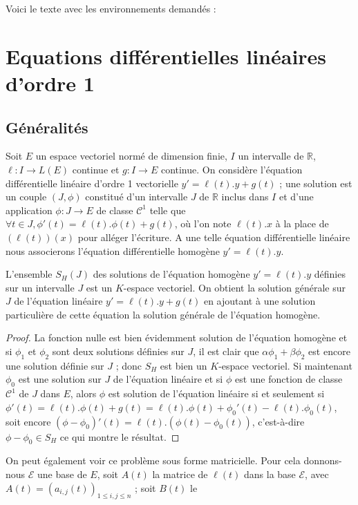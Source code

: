 Voici le texte avec les environnements demandés :
\section{Equations différentielles linéaires d'ordre 1}
\subsection{Généralités}
Soit $E$ un espace vectoriel normé de dimension finie, $I$ un intervalle de
$\mathbb{R}$, $\ell : I \rightarrow L(E)$ continue et $g : I \rightarrow E$ continue. On considère l'équation
différentielle linéaire d'ordre 1 vectorielle $y' = \ell(t).y + g(t)$ ; une
solution est un couple $(J,\phi)$ constitué d'un intervalle $J$ de $\mathbb{R}$ inclus
dans $I$ et d'une application $\phi : J \rightarrow E$ de classe $\mathcal{C}^1$ telle que
$\forall t \in J, \phi'(t) = \ell(t).\phi(t) + g(t)$, où l'on note
$\ell(t).x$ à la place de $(\ell(t))(x)$ pour alléger l'écriture. A une telle équation différentielle
linéaire nous associerons l'équation différentielle homogène $y' = \ell(t).y$.
\begin{thm}
L'ensemble $S_H(J)$ des solutions de l'équation
homogène $y' = \ell(t).y$ définies sur un intervalle $J$ est un $K$-espace
vectoriel. On obtient la solution générale sur $J$ de l'équation linéaire
$y' = \ell(t).y + g(t)$ en ajoutant à une solution particulière de cette
équation la solution générale de l'équation homogène.
\end{thm}
\begin{proof}
La fonction nulle est bien évidemment solution de
l'équation homogène et si $\phi_1$ et $\phi_2$ sont deux
solutions définies sur $J$, il est clair que $\alpha \phi_1 + \beta \phi_2$
est encore une solution définie sur $J$ ; donc $S_H$ est bien un $K$-espace vectoriel. Si maintenant $\phi_0$ est une solution sur $J$ de
l'équation linéaire et si $\phi$ est une fonction de classe $\mathcal{C}^1$ de
$J$ dans $E$, alors $\phi$ est solution de l'équation linéaire si et seulement
si $\phi'(t) = \ell(t).\phi(t) + g(t) = \ell(t).\phi(t) + \phi_0'(t) -
\ell(t).\phi_0(t)$, soit encore $(\phi - \phi_0)'(t) = \ell(t).(\phi(t) -
\phi_0(t))$, c'est-à-dire $\phi - \phi_0 \in S_H$ ce qui
montre le résultat.
\end{proof}
On peut également voir ce problème sous forme matricielle. Pour cela
donnons-nous $\mathcal{E}$ une base de $E$, soit $A(t)$ la matrice de $\ell(t)$ dans la base
$\mathcal{E}$, avec $A(t) = (a_{i,j}(t))_{1 \leq i,j \leq n}$ ; soit $B(t)$ le
